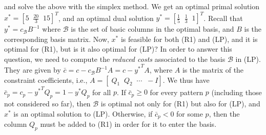 and solve the above with the simplex method. We get an optimal primal solution
$x^* = [ 5 \;\; \frac{20}{3} \;\; 15 ]^T$, and an optimal dual solution
$y^* = [ \frac{1}{5} \;\; \frac{1}{3} \;\; 1 ]^T$.
Recall that $y^* = c_{\mathcal{B}} B^{-1}$ where $\mathcal{B}$ is the
set of basic columns in the optimal basis, and $B$ is the corresponding
basis matrix. Now, $x^*$ is feasible for both (R1) and (LP), and
it is optimal for (R1), but is it also optimal for (LP)?
In order to answer this question, we need to compute the 
\emph{reduced costs} associated to the basis $\mathcal{B}$ in (LP).
They are given by
$\bar c = c - c_{\mathcal{B}} B^{-1} A = c - {y^*}^T A$, where $A$ is
the matrix of the constraint coefficients,
i.e., $A = [ \; Q_1 \;\; Q_2 \;\; \cdots \;\; -I ]$.
We thus have $\bar c_p = c_p - {y^*}^T Q_p = 1 - y^* Q_p$ for all $p$.
If $\bar c_p \geq 0$ for every pattern $p$ (including those
not considered so far), then $\mathcal{B}$ is optimal not only for (R1)
but also for (LP), and $x^*$ is an optimal solution to (LP).
Otherwise, if $\bar c_p < 0$ for some $p$, then the column $Q_p$ must
be added to (R1) in order for it to enter the basis.

